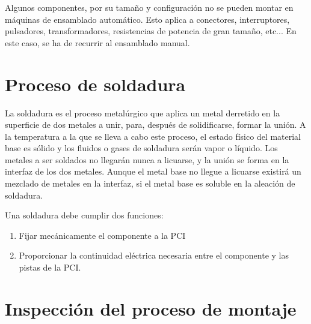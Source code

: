 Algunos componentes, por su tamaño y configuración no se pueden montar en máquinas de ensamblado automático. Esto aplica a conectores, interruptores, pulsadores, transformadores, resistencias de potencia de gran tamaño, etc... En este caso, se ha de recurrir al ensamblado manual.

\section{Proceso de soldadura}
La soldadura es el proceso metalúrgico que aplica un metal derretido en la superficie de dos metales a unir, para, después de solidificarse, formar la unión. A la temperatura a la que se lleva a cabo este proceso, el estado físico del material base es sólido y los fluidos o gases de soldadura serán vapor o líquido. Los metales a ser soldados no llegarán nunca a licuarse, y la unión se forma en la interfaz de los dos metales. Aunque el metal base no llegue a licuarse existirá un mezclado de metales en la interfaz, si el metal base es soluble en la aleación de soldadura.

Una soldadura debe cumplir dos funciones:
\begin{enumerate}
    \item Fijar mecánicamente el componente a la PCI
    \item Proporcionar la continuidad eléctrica necesaria entre el componente y las pistas de la PCI.
\end{enumerate}

\section{Inspección del proceso de montaje}
